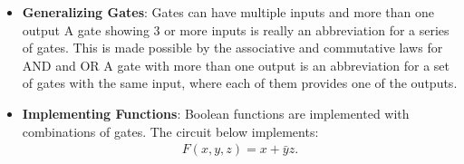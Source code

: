 \documentclass{report}
\begin{document}
\begin{itemize}
        \item \textbf{Generalizing Gates}:
            Gates can have multiple inputs and more than one output
            \bigbreak \noindent 
            A gate showing 3 or more inputs is really an abbreviation for a series of gates. This is made possible by the associative and commutative laws for AND and OR
            \bigbreak \noindent 
            \bigbreak \noindent 
        A gate with more than one output is an abbreviation for a set of gates with the same input, where each of them provides one of the outputs.
        \bigbreak \noindent 
    \item \textbf{Implementing Functions}:
        Boolean functions are implemented with
        combinations of gates.
        \bigbreak \noindent 
        The circuit below implements:
        \begin{align*}
            F(x,y,z) = x + \bar{y}z
        .\end{align*}
        \bigbreak \noindent 

    \end{itemize}

    \pagebreak 
\end{document}

